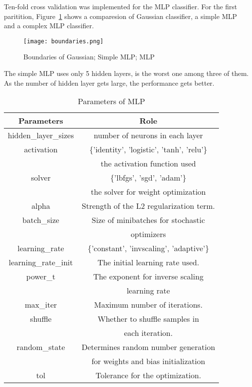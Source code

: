 \documentclass[10pt]{article}
\newcommand{\figsquish}{\vspace{-5mm}} %
\begin{document}
\begin{multicols*}{2}
Ten-fold cross validation was implemented for the MLP classifier. For the first paritition, Figure~\ref*{fig:boundaries} shows a comparesion of Gaussian classifier,
a simple MLP and a complex MLP classifier. 

\figsquish
\begin{figure}[H]
    \centering
    \texttt{[image: boundaries.png]}
    \caption{Boundaries of Gaussian; Simple MLP; MLP}
    \label{fig:boundaries}
\end{figure}

The simple MLP uses only 5 hidden layers, is the worst one among three of them. As the number of hidden layer gets large, the performance gets better. 

\figsquish
\begin{table}[H]
    \centering
    \caption{Parameters of MLP}
    \begin{tabular}{|c|c|}
        \hline
        Parameters & Role\\
        \midrule
        hidden\_layer\_sizes & number of neurons in each layer\\
        activation & \{'identity', 'logistic', 'tanh', 'relu'\}\\
        & the activation function used\\
        solver & \{'lbfgs', 'sgd', 'adam'\}\\
        & the solver for weight optimization \\
        alpha & Strength of the L2 regularization term.\\
        batch\_size & Size of minibatches for stochastic \\ & optimizers\\
        learning\_rate & \{'constant', 'invscaling', 'adaptive'\}\\
        learning\_rate\_init & The initial learning rate used. \\
        power\_t & The exponent for inverse scaling \\ & learning rate\\
        max\_iter & Maximum number of iterations.\\
        shuffle & Whether to shuffle samples in \\ & each iteration.\\
        random\_state & Determines random number generation \\ & for weights and bias initialization\\
        tol & Tolerance for the optimization.\\

\end{tabular}
\end{table}
\end{multicols*}
\end{document}
